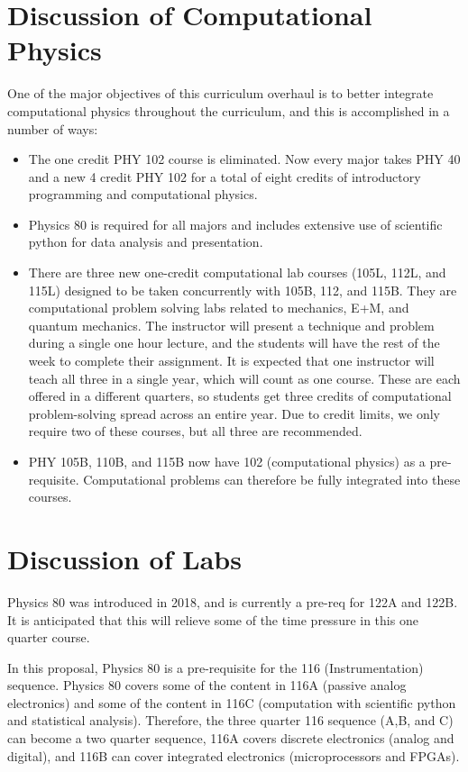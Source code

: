 \documentclass[12pt]{article}
\begin{document}
\section{Discussion of Computational Physics}
One of the major objectives of this curriculum overhaul is to better integrate computational physics throughout the curriculum, and this is accomplished in a number of ways:
\begin{itemize}
\item The one credit PHY 102 course is eliminated.  Now every major takes PHY 40 and a new 4 credit PHY 102 for a total of eight credits of introductory programming and computational physics. 
\item Physics 80 is required for all majors and includes extensive use of scientific python for data analysis and presentation.
\item There are three new one-credit computational lab courses (105L, 112L, and 115L) designed to be taken concurrently with 105B, 112, and 115B. They are computational problem solving labs related to mechanics, E+M, and quantum mechanics.  The instructor will present a technique and problem during a single one hour lecture, and the students will have the rest of the week to complete their assignment.  It is expected that one instructor will teach all three in a single year, which will count as one course.
These are each offered in a different quarters, so students get three credits of computational problem-solving spread across an entire year.  Due to credit limits, we only require two of these courses, but all three are recommended.
\item PHY 105B, 110B, and 115B now have 102 (computational physics) as a pre-requisite.  Computational problems can therefore be fully integrated into these courses.
\end{itemize}

\section{Discussion of Labs}

Physics 80 was introduced in 2018, and is currently a pre-req for 122A and 122B.  It is anticipated that this will relieve some of the time pressure in this one quarter course.

In this proposal, Physics 80 is a pre-requisite for the 116 (Instrumentation) sequence.  Physics 80 covers some of the content in 116A (passive analog electronics) and some of the content in 116C (computation with scientific python and statistical analysis).  Therefore, the three quarter 116 sequence (A,B, and C) can become a two quarter sequence, 116A covers discrete electronics (analog and digital), and 116B can cover integrated electronics (microprocessors and FPGAs).
\end{document}
